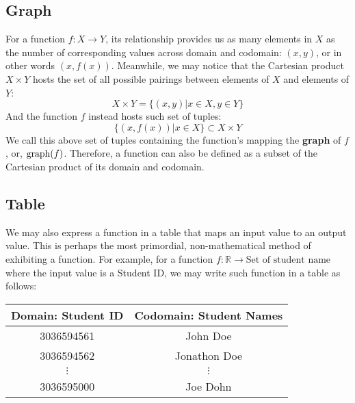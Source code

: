 \subsection{Graph}
For a function $f: X \rightarrow Y$, its relationship provides us as many elements in $X$ as the number of corresponding values across domain and codomain: $(x, y)$, or in other words $(x, f(x))$.
Meanwhile, we may notice that the Cartesian product $X \times Y$ hosts the set of all possible pairings between elements of $X$ and elements of $Y$:
\[
    X \times Y = \{(x, y) | x \in X, y \in Y\}
\]
And the function $f$ instead hosts such set of tuples:
\[
    \{(x, f(x)) | x \in X\} \subset X \times Y
\]
We call this above set of tuples containing the function's mapping the \textbf{graph} of $f$, or, ${\rm graph}(f)$.
Therefore, a function can also be defined as a subset of the Cartesian product of its domain and codomain.

\subsection{Table}
We may also express a function in a table that maps an input value to an output value.
This is perhaps the most primordial, non-mathematical method of exhibiting a function.
For example, for a function $f: \mathbb{R} \rightarrow \text{Set of student name}$ where the input value is a Student ID, we may write such function in a table as follows:
\begin{center}
    \begin{tabular}{c|c}
        Domain: Student ID & Codomain: Student Names \\
        \hline
        3036594561 & John Doe \\
        3036594562 & Jonathon Doe \\
        $\vdots$ & $\vdots$ \\
        3036595000 & Joe Dohn
    \end{tabular}
\end{center}

